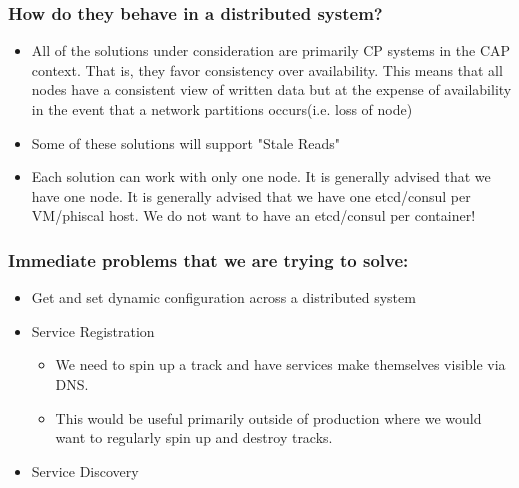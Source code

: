 \begin{frame}
    \frametitle{How do they behave in a distributed system?}

\begin{itemize}
    \item All of the solutions under consideration are primarily CP systems in the CAP context. That is, they favor consistency over availability. This means that all nodes have a consistent view of written data but at the expense of availability in the event that a network partitions occurs(i.e. loss of node)
    \item Some of these solutions will support "Stale Reads"
    \item Each solution can work with only one node. It is generally advised that we have one node. It is generally advised that we have one etcd/consul per VM/phiscal host. We do not want to have an etcd/consul per container!
\end{itemize}

\end{frame}

\begin{frame}
    \frametitle{Immediate problems that we are trying to solve:}
\begin{itemize}
    \item Get and set dynamic configuration across a distributed system
    \item Service Registration
        \begin{itemize}
            \item We need to spin up a track and have services make themselves visible via DNS.
            \item This would be useful primarily outside of production where we would want to regularly spin up and destroy tracks.
        \end{itemize}
    \item Service Discovery
\end{itemize}

\end{frame}
